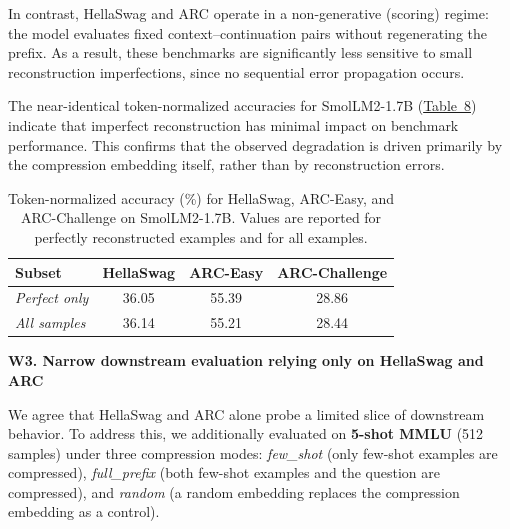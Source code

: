 In contrast, HellaSwag and ARC operate in a non-generative (scoring) regime: the model evaluates fixed context–continuation pairs without regenerating the prefix. As a result, these benchmarks are significantly less sensitive to small reconstruction imperfections, since no sequential error propagation occurs.

The near-identical token-normalized accuracies for SmolLM2-1.7B (\href{https://drive.google.com/file/d/1B4ALS1umyqq70ScHf-_1XtVp04rdG6eY/view?usp=sharing}{Table~8}) indicate that imperfect reconstruction has minimal impact on benchmark performance. This confirms that the observed degradation is driven primarily by the compression embedding itself, rather than by reconstruction errors.

\begin{table}[t]
\centering
\caption{Token-normalized accuracy (\%) for HellaSwag, ARC-Easy, and ARC-Challenge on SmolLM2-1.7B. Values are reported for perfectly reconstructed examples and for all examples.}
\label{tab:rebuttal_token_norm}
\small
\begin{tabular}{lccc}
\toprule
\textbf{Subset} & \textbf{HellaSwag} & \textbf{ARC-Easy} & \textbf{ARC-Challenge} \\
\midrule
\textit{Perfect only} & 36.05 & 55.39 & 28.86 \\
\textit{All samples}  & 36.14 & 55.21 & 28.44 \\
\bottomrule
\end{tabular}
\end{table}



\textbf{W3. Narrow downstream evaluation relying only on HellaSwag and ARC}

We agree that HellaSwag and ARC alone probe a limited slice of downstream behavior.
To address this, we additionally evaluated on \textbf{5-shot MMLU} (512 samples) under
three compression modes: \textit{few\_shot} (only few-shot examples are compressed),
\textit{full\_prefix} (both few-shot examples and the question are compressed), and
\textit{random} (a random embedding replaces the compression embedding as a control).

